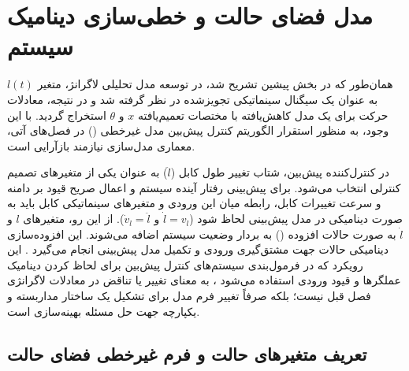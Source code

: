 
\section{مدل فضای حالت و خطی‌سازی دینامیک سیستم}

همان‌طور که در بخش پیشین تشریح شد، در توسعه مدل تحلیلی لاگرانژ، متغیر $l(t)$ به عنوان یک سیگنال سینماتیکی تجویزشده در نظر گرفته شد و در نتیجه، معادلات حرکت برای یک مدل کاهش‌یافته با مختصات تعمیم‌یافته $x$ و $\theta$ استخراج گردید. با این وجود، به منظور استقرار الگوریتم کنترل پیش‌بین مدل غیرخطی () در فصل‌های آتی، معماری مدل‌سازی نیازمند بازآرایی است.

در کنترل‌کننده پیش‌بین، شتاب تغییر طول کابل ($\ddot{l}$) به عنوان یکی از متغیرهای تصمیم کنترلی انتخاب می‌شود. برای پیش‌بینی رفتار آینده سیستم و اعمال صریح قیود بر دامنه و سرعت تغییرات کابل، رابطه میان این ورودی و متغیرهای سینماتیکی کابل باید به صورت دینامیکی در مدل پیش‌بینی لحاظ شود ($\dot{l} = v_l$ و $\dot{v}_l = \ddot{l}$). از این رو، متغیرهای $l$ و $\dot{l}$ به صورت حالات افزوده () به بردار وضعیت سیستم اضافه می‌شوند. این افزوده‌سازی دینامیکی حالات جهت مشتق‌گیری ورودی و تکمیل مدل پیش‌بینی انجام می‌گیرد \cite{Homaeinezhad2026Solution}. این رویکرد که در فرمول‌بندی سیستم‌های کنترل پیش‌بین برای لحاظ کردن دینامیک عملگرها و قیود ورودی استفاده می‌شود \cite{Allgower2004Nonlinear, Zak2017Introduction}، به معنای تغییر یا تناقض در معادلات لاگرانژی فصل قبل نیست؛ بلکه صرفاً تغییر فرم مدل برای تشکیل یک ساختار مداربسته و یکپارچه جهت حل مسئله بهینه‌سازی است.

\subsection{تعریف متغیرهای حالت و فرم غیرخطی فضای حالت}

